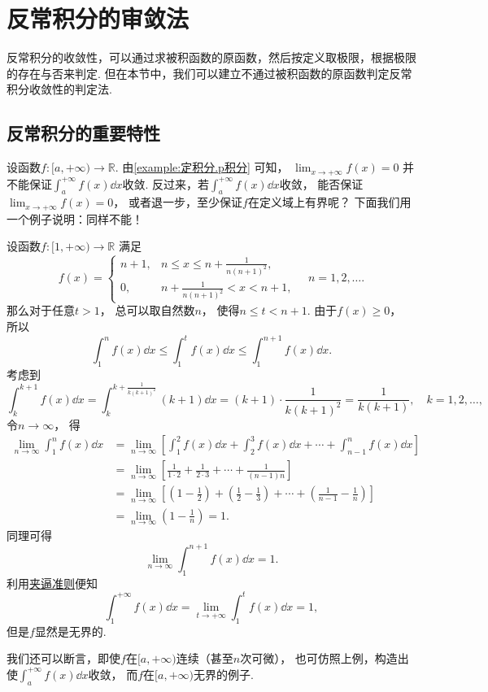\section{反常积分的审敛法}
反常积分的收敛性，可以通过求被积函数的原函数，然后按定义取极限，根据极限的存在与否来判定.
但在本节中，我们可以建立不通过被积函数的原函数判定反常积分收敛性的判定法.

\subsection{反常积分的重要特性}
设函数\(f\colon[a,+\infty)\to\mathbb{R}\).
由\cref{example:定积分.p积分} 可知，
\(\lim_{x\to+\infty} f(x) = 0\)
并不能保证\(\int_a^{+\infty} f(x) \dd{x}\)收敛.
反过来，若\(\int_a^{+\infty} f(x) \dd{x}\)收敛，
能否保证\(\lim_{x\to+\infty} f(x) = 0\)，
或者退一步，至少保证\(f\)在定义域上有界呢？
下面我们用一个例子说明：同样不能！
\begin{example}
设函数\(f\colon[1,+\infty)\to\mathbb{R}\)
满足\[
	f(x) = \left\{ \begin{array}{cl}
		n+1, & n \leq x \leq n+\frac1{n(n+1)^2}, \\
		0, & n+\frac1{n(n+1)^2} < x < n+1,
	\end{array} \right.
	\quad n=1,2,\dotsc.
\]
那么对于任意\(t>1\)，
总可以取自然数\(n\)，
使得\(n \leq t < n+1\).
由于\(f(x)\geq0\)，
所以\[
	\int_1^n f(x) \dd{x}
	\leq \int_1^t f(x) \dd{x}
	\leq \int_1^{n+1} f(x) \dd{x}.
\]
考虑到\[
	\int_k^{k+1} f(x) \dd{x}
	= \int_k^{k+\frac1{k(k+1)^2}} (k+1) \dd{x}
	= (k+1) \cdot \frac1{k(k+1)^2}
	= \frac1{k(k+1)},
	\quad k=1,2,\dotsc,
\]
令\(n\to\infty\)，
得\begin{align*}
	\lim_{n\to\infty} \int_1^n f(x) \dd{x}
	&= \lim_{n\to\infty} \left[
		\int_1^2 f(x) \dd{x}
		+ \int_2^3 f(x) \dd{x}
		+ \dotsb
		+ \int_{n-1}^n f(x) \dd{x}
	\right] \\
	&= \lim_{n\to\infty} \left[
		\frac1{1\cdot2}
		+ \frac1{2\cdot3}
		+ \dotsb
		+ \frac1{(n-1)n}
	\right] \\
	&= \lim_{n\to\infty} \left[
		\left(1-\frac12\right)
		+ \left(\frac12-\frac13\right)
		+ \dotsb
		+ \left(\frac1{n-1}-\frac1n\right)
	\right] \\
	&= \lim_{n\to\infty} \left(1-\frac1n\right)
	= 1.
\end{align*}
同理可得\[
	\lim_{n\to\infty} \int_1^{n+1} f(x) \dd{x} = 1.
\]
利用\hyperref[theorem:数列极限.夹逼准则]{夹逼准则}便知\[
	\int_1^{+\infty} f(x) \dd{x}
	= \lim_{t\to+\infty} \int_1^t f(x) \dd{x}
	= 1,
\]
但是\(f\)显然是无界的.
\end{example}
我们还可以断言，即使\(f\)在\([a,+\infty)\)连续（甚至\(n\)次可微），
也可仿照上例，构造出使\(\int_a^{+\infty} f(x) \dd{x}\)收敛，
而\(f\)在\([a,+\infty)\)无界的例子.

